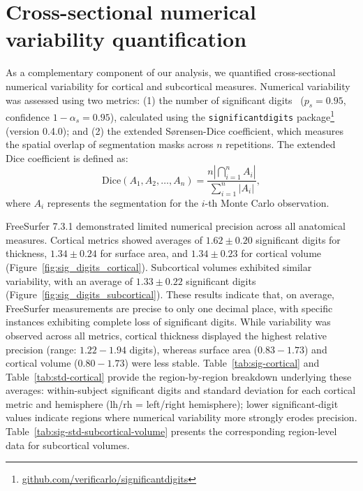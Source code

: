 \section{Cross-sectional numerical variability quantification\label{appendix:numerical_variability_baseline}}

As a complementary component of our analysis, we quantified cross-sectional
numerical variability for cortical and subcortical measures. Numerical
variability was assessed using two metrics: (1) the number of significant
digits~\cite{sohier2021confidence} ($p_s=0.95$, confidence $1-\alpha_s=0.95$),
calculated using the \texttt{significantdigits}
package\footnote{\url{github.com/verificarlo/significantdigits}} (version
0.4.0); and (2) the extended Sørensen-Dice coefficient, which measures the
spatial overlap of segmentation masks across $n$ repetitions. The extended Dice
coefficient is defined as:
\begin{equation}
    \text{Dice}(A_1, A_2, \dots, A_n) = \frac{n \left| \bigcap_{i=1}^{n} A_i \right|}{\sum_{i=1}^{n} \left| A_i \right|},
    \label{eq:dice}
\end{equation}
where $A_i$ represents the segmentation for the $i$-th Monte Carlo observation.

FreeSurfer 7.3.1 demonstrated limited numerical precision across all anatomical
measures. Cortical metrics showed averages of $1.62 \pm 0.20$ significant
digits for thickness, $1.34 \pm 0.24$ for surface area, and $1.34 \pm 0.23$ for
cortical volume (Figure~\ref{fig:sig_digits_cortical}). Subcortical volumes
exhibited similar variability, with an average of $1.33 \pm 0.22$ significant
digits (Figure~\ref{fig:sig_digits_subcortical}). These results indicate that,
on average, FreeSurfer measurements are precise to only one decimal place, with
specific instances exhibiting complete loss of significant digits. While
variability was observed across all metrics, cortical thickness displayed the
highest relative precision (range: $1.22-1.94$ digits), whereas surface area
($0.83 - 1.73$) and cortical volume ($0.80 - 1.73$) were less stable.
Table~\ref{tab:sig-cortical} and Table~\ref{tab:std-cortical} provide the
region-by-region breakdown underlying these averages: within-subject
significant digits and standard deviation for each cortical metric and
hemisphere (lh/rh = left/right hemisphere); lower significant-digit values
indicate regions where numerical variability more strongly erodes precision.
Table~\ref{tab:sig-std-subcortical-volume} presents the corresponding
region-level data for subcortical volumes.

